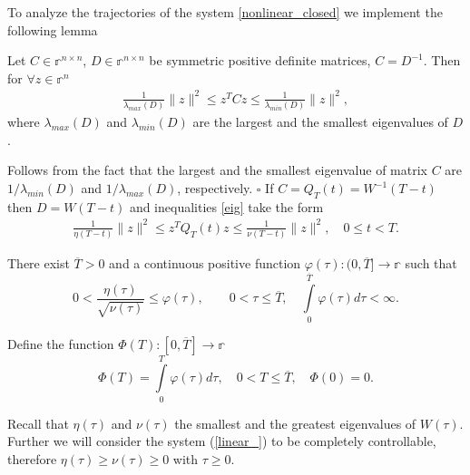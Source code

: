 \documentclass[../main.tex]{subfiles}
\begin{document}
To analyze the trajectories of the system \eqref{nonlinear_closed} we  implement the following lemma
\begin{lemma}\label{lem:zqz} 
    Let $C\in \mathbb{r}^{ n \times n}$, $D\in \mathbb{r}^{n \times n}$ be symmetric positive definite matrices, $C=D^{-1}$. Then for $\forall z \in \mathbb{r}^{n}$   
    \begin{gather} \label{eig}
        \frac{1}{\lambda_{max}(D)} \|z\|^2 \leqslant z^T C z \leqslant \frac{1}{\lambda_{min}(D)} \|z\|^2,
    \end{gather}
    where $\lambda_{max}(D)$ and $\lambda_{min}(D)$ are the largest and the smallest eigenvalues of  $D$.
\end{lemma}
\doc
  Follows from the fact that the largest and the smallest eigenvalue of matrix $C$ are $1/{\lambda_{min}(D)}$ and $1/{\lambda_{max}(D)}$, respectively. 
	\hfill $ \square $
If  $C=Q_T(t)=W^{-1}(T-t)$ then $D=W(T-t)$ and inequalities \eqref{eig} take the form
\begin{gather*} %
        \frac{1}{\eta(T-t)} \|z\|^2 \leqslant z^T Q_T(t) z \leqslant \frac{1}{\nu(T-t)} \|z\|^2, \quad 0\leqslant t < T.
    \end{gather*}
\begin{assumption} \label{asm1}   
   There exist $\overline{T}>0$ and  a continuous positive function $\varphi(\tau): (0, \overline{T}] \to \mathbb{r}$ such that
\begin{equation*}
    0 < \frac{\eta(\tau)}{\sqrt{\nu(\tau)}} \leqslant \varphi(\tau), \qquad 0 < \tau \leqslant \overline{T},\quad \int\limits_0^ {\overline{T}}\varphi(\tau) d\tau<\infty.
\end{equation*} 
\end{assumption}
Define the function $\Phi(T): [0, \overline{T}] \to \mathbb{r}$
\begin{equation*}
    \Phi(T)= \int\limits_0^ {T}\varphi(\tau) d\tau,\quad 0 <  T \leqslant \overline{T},\quad  \Phi(0)=0.
\end{equation*} 

 Recall that $\eta(\tau)$ and $\nu(\tau)$ the smallest and the greatest eigenvalues of $W(\tau)$. Further we will consider the system (\ref{linear_}) to be completely controllable, therefore $\eta(\tau) \geqslant \nu(\tau) \geqslant 0$  with $\tau \geq 0$.
 
\end{document}
